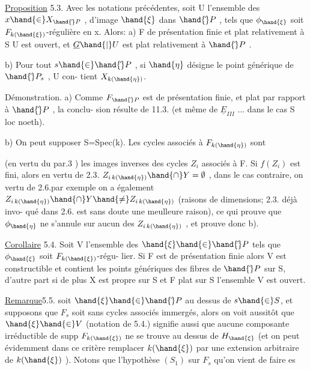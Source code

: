 
\uline{Proposition} 5.3.   Avec les notations précédentes, soit U l'ensemble des
$x\hand{\in} X_{\hand{\check{}}P}$ , d'image $\hand{\xi}$ dans $\hand{\check{}}P$ , tels que $\phi_{\hand{\xi}}$ soit $F_{k(\hand{\xi})}$-régulière en x.  Alors:
a)  F de présentation finie et plat relativement à S\hand{,} U est ouvert, et $\underline{G}\hand{|}U$ est plat relativement à $\hand{\check{}}P$ .

b) Pour tout $s\hand{\in}\hand{\check{}}P$ , si $\hand{\eta}$ désigne le point générique de $\hand{\check{}}P_s$ , U con-%
tient $X_{k(\hand{\eta})}$.

Démonstration. a) Comme $F_{\hand{\check{}}P}$ est de présentation finie, et plat par rapport à $\hand{\check{}}P$ , la conclu-%
sion résulte de 11.3. (et même de $\underline{E}_{III}$ ... dans le cas S loc noeth).

b) On peut supposer S=Spec(k). Les cycles associés à $F_{k(\hand{\eta})}$ sont

(en vertu du par.3 ) les images inverses des cycles $Z_i$ associés à F.  Si $f(Z_i)$ est fini, alors en vertu de 2.3. 
$Z_{i\,k(\hand{\eta})}\hand{\cap} Y = \emptyset$ , dans le cas contraire, on vertu de 2.6.par exemple on a
également $Z_{i\,k(\hand{\eta})}\hand{\cap} Y \hand{\neq} Z_{i\,k(\hand{\eta})}$ (raisons de dimensions; 2.3. déjà invo-%
qué dans 2.6. est sans doute une meulleure raison), ce qui prouve que $\phi_{\hand{\eta}}$
ne s'annule sur aucun des $Z_{i\,k(\hand{\eta})}$ , et prouve donc b).

\uline{Corollaire} 5.4. Soit V l'ensemble des $\hand{\xi}\hand{\in}\hand{\check{}}P$ tels que $\phi_{\hand{\xi}}$ soit  $F_{k(\hand{\xi})}$-régu-%
lier. Si F est de présentation finie alors V est constructible et contient les points génériques des
fibres de $\hand{\check{}}P$ sur S, d'autre part si de plus X est propre sur S et F plat sur S\hand{,} l'ensemble V est
ouvert. 

\uline{Remarque}5.5.  soit $\hand{\xi}\hand{\in}\hand{\check{}}P$ au dessus de $s\hand{\in} S$, et supposons
que $F_s$ soit sans cycles associés immergés, alors on voit aussitôt que
$\hand{\xi}\hand{\in} V$ (notation de 5.4.) signifie aussi que aucune composante
irréductible de supp $F_{k(\hand{\xi})}$ ne se trouve au dessus de $H_{\hand{\xi}}$ (et on peut
évidemment dans ce critère remplacer $k(\hand{\xi})$ par une extension arbitraire
de $k(\hand{\xi})$ ). Notons que l'hypothèse $(S_1)$ sur $F_s$ qu'on vient de faire es


